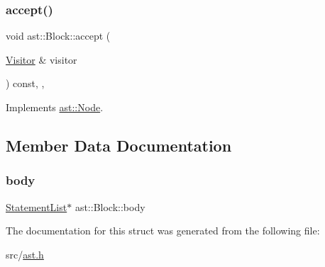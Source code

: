 \subsubsection{\texorpdfstring{accept()}{accept()}}
{\footnotesize\ttfamily void ast\+::\+Block\+::accept (\begin{DoxyParamCaption}\item[{\hyperlink{structast_1_1_visitor}{Visitor} \&}]{visitor }\end{DoxyParamCaption}) const\hspace{0.3cm}{\ttfamily [inline]}, {\ttfamily [override]}, {\ttfamily [virtual]}}



Implements \hyperlink{structast_1_1_node_abc089ee6caaf06a4445ebdd8391fdebc}{ast\+::\+Node}.



\subsection{Member Data Documentation}
\mbox{\label{structast_1_1_block_a7d7ba772aed3b8db5e26360b4f613410}} 
\subsubsection{\texorpdfstring{body}{body}}
{\footnotesize\ttfamily \hyperlink{structast_1_1_statement_list}{Statement\+List}$\ast$ ast\+::\+Block\+::body}



The documentation for this struct was generated from the following file\+:\begin{DoxyCompactItemize}
\item 
src/\hyperlink{ast_8h}{ast.\+h}\end{DoxyCompactItemize}
